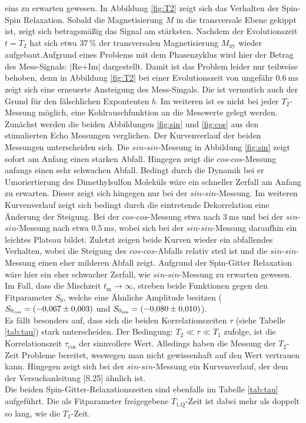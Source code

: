 eins zu erwarten gewesen. In Abbildung \ref{fig:T2} zeigt sich das Verhalten der
Spin-Spin Relaxation. Sobald die Magnetisierung $M$ in die transversale Ebene gekippt
ist, zeigt sich betragsmäßig das Signal am stärksten. Nachdem der Evolutionszeit
$t=T_2$ hat sich etwa $37\,\%$ der transversalen Magnetisierung $M_{\text{xy}}$
wieder aufgebaut.Aufgrund eines Problems mit dem Phasenzyklus wird hier der
Betrag des Mess-Signals: $|$Re$+$Im$|$ dargestellt. Damit ist das Problem leider
nur teilweise behoben, denn in Abbildung \ref{fig:T2} bei einer Evolutionszeit
von ungefähr $\SI{0,6}{\milli\second}$ zeigt sich eine erneuerte Ansteigung des
Mess-Singals. Die ist vermutich auch der Grund für den fälschlichen Expontenten $b$.
Im weiteren ist es nicht bei jeder $T_2$-Messung möglich, eine Kohlrauschfunktion
an die Messwerte gelegt werden.\\
Zunächst werden die beiden Abbildungen \ref{fig:sin} und \ref{fig:cos} aus den
stimulierten Echo Messungen verglichen. Der Kurvenverlauf der beiden Messungen
unterscheiden sich. Die $sin$-$sin$-Messung in Abbildung \ref{fig:sin}
zeigt sofort am Anfang einen starken Abfall. Hingegen zeigt die $cos$-$cos$-Messung
anfangs einen sehr schwachen Abfall. Bedingt durch die Dynamik bei er Umoriertierung
des Dimethylsulfon Moleküls wäre ein schneller Zerfall am Anfang zu erwarten.
Dieser zeigt sich hingegen nur bei der $sin$-$sin$-Messung. Im weiteren Kurvenverlauf
zeigt sich bedingt durch die eintretende Dekorrelation eine Änderung der Steigung.
Bei der $cos$-$cos$-Messung etwa nach $\SI{3}{\milli\second}$ und bei der
$sin$-$sin$-Messung nach etwa $\SI{0.5}{\milli\second}$, wobei sich bei der
$sin$-$sin$-Messung daraufhin ein leichtes Plateau bildet.
Zuletzt zeigen beide Kurven wieder ein abfallendes Verhalten, wobei die Steigung
des $cos$-$cos$-Abfalls relativ steil ist und die $sin$-$sin$-Messung einen eher
milderen Abfall zeigt. Aufgrund der Spin-Gitter Relaxation wäre hier ein eher
schwacher Zerfall, wie $sin$-$sin$-Messung zu erwarten gewesen. Im Fall, dass die
Mischzeit $t_{\text{m}} \rightarrow\infty$, streben beide Funktionen gegen den
Fitparameter $S_0$, welche eine Ähnliche Amplitude besitzen ($S_{0_{\text{cos}}} = \SI{-0.067\pm0.003}{}$ und
$S_{0_{\text{sin}}} = \SI{-0.080\pm0.01}{}$).\\
Es fällt besonders auf, dass sich die beiden Korrelationszeiten $\tau$ (siehe
Tabelle \ref{tab:tau}) stark unterscheiden. Der Bedingung: $T_2 \ll \tau \ll T_1$
zufolge, ist die Korrelationszeit $\tau_{\text{cos}}$ der sinnvollere Wert.
Alledings haben die Messung der $T_2$-Zeit Probleme bereitet, weswegen man
nicht gewissenhaft auf den Wert vertrauen kann. Hingegen zeigt sich bei der
$sin$-$sin$-Messung ein Kurvenverlauf, der dem der Versuchanleitung \cite{Anleitung}[S.25]
ähnlich ist.\\
Die beiden Spin-Gitter-Relaxationszeiten sind ebenfalls im Tabelle \ref{tab:tau}
aufgeführt. Die als Fitparameter freigegebene $T_{1\text{,Q}}$-Zeit ist dabei mehr
als doppelt so lang, wie die $T_1$-Zeit.

